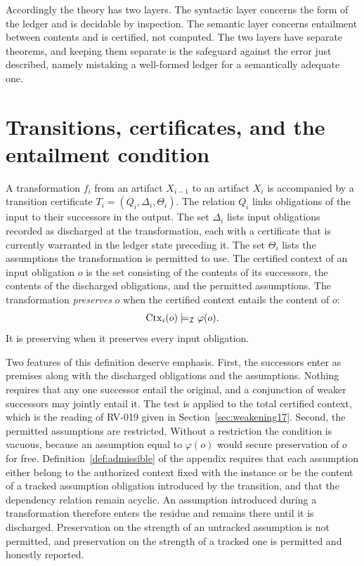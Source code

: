 Accordingly the theory has two layers. The syntactic layer concerns the form of the ledger and is decidable by inspection. The semantic layer concerns entailment between contents and is certified, not computed. The two layers have separate theorems, and keeping them separate is the safeguard against the error just described, namely mistaking a well-formed ledger for a semantically adequate one.

\section{Transitions, certificates, and the entailment condition}

A transformation $f_i$ from an artifact $X_{i-1}$ to an artifact $X_i$ is accompanied by a transition certificate $T_i = (Q_i, \Delta_i, \Theta_i)$. The relation $Q_i$ links obligations of the input to their successors in the output. The set $\Delta_i$ lists input obligations recorded as discharged at the transformation, each with a certificate that is currently warranted in the ledger state preceding it. The set $\Theta_i$ lists the assumptions the transformation is permitted to use. The certified context of an input obligation $o$ is the set consisting of the contents of its successors, the contents of the discharged obligations, and the permitted assumptions. The transformation \emph{preserves} $o$ when the certified context entails the content of $o$:
\[
\operatorname{Ctx}_i(o) \models_{\mathcal{I}} \varphi(o).
\]
It is preserving when it preserves every input obligation.

Two features of this definition deserve emphasis. First, the successors enter as premises along with the discharged obligations and the assumptions. Nothing requires that any one successor entail the original, and a conjunction of weaker successors may jointly entail it. The test is applied to the total certified context, which is the reading of RV-019 given in Section~\ref{sec:weakening17}. Second, the permitted assumptions are restricted. Without a restriction the condition is vacuous, because an assumption equal to $\varphi(o)$ would secure preservation of $o$ for free. Definition~\ref{def:admissible} of the appendix requires that each assumption either belong to the authorized context fixed with the instance or be the content of a tracked assumption obligation introduced by the transition, and that the dependency relation remain acyclic. An assumption introduced during a transformation therefore enters the residue and remains there until it is discharged. Preservation on the strength of an untracked assumption is not permitted, and preservation on the strength of a tracked one is permitted and honestly reported.


